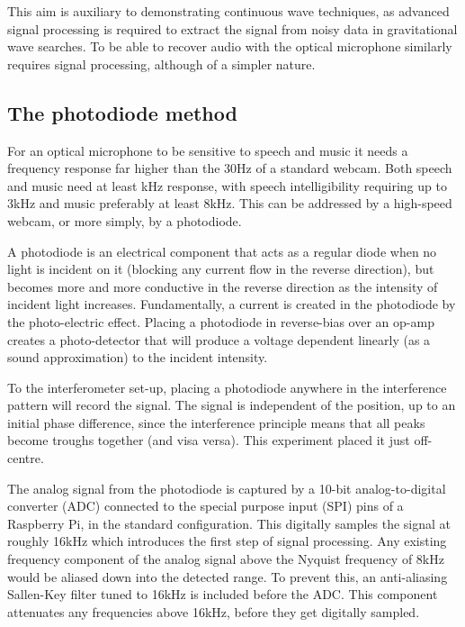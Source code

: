 \documentclass[prb,preprint]{revtex4-1}
\begin{document}
This aim is auxiliary to demonstrating continuous wave techniques, as advanced signal processing is required to extract the signal from noisy data in gravitational wave searches. To be able to recover audio with the optical microphone similarly requires signal processing, although of a simpler nature.

\subsection{The photodiode method}
\label{sec:photodiode}

For an optical microphone to be sensitive to speech and music it needs a frequency response far higher than the 30Hz of a standard webcam. Both speech and music need at least kHz response, with speech intelligibility requiring up to 3kHz and music preferably at least 8kHz. This can be addressed by a high-speed webcam, or more simply, by a photodiode.


A photodiode is an electrical component that acts as a regular diode when no light is incident on it (blocking any current flow in the reverse direction), but becomes more and more conductive in the reverse direction as the intensity of incident light increases. Fundamentally, a current is created in the photodiode by the photo-electric effect. Placing a photodiode in reverse-bias over an op-amp creates a photo-detector that will produce a voltage dependent linearly (as a sound approximation) to the incident intensity.


To the interferometer set-up, placing a photodiode anywhere in the interference pattern will record the signal. The signal is independent of the position, up to an initial phase difference, since the interference principle means that all peaks become troughs together (and visa versa). This experiment placed it just off-centre.


The analog signal from the photodiode is captured by a 10-bit analog-to-digital converter (ADC) connected to the special purpose input (SPI) pins of a Raspberry Pi, in the standard configuration. This digitally samples the signal at roughly 16kHz which introduces the first step of signal processing. Any existing frequency component of the analog signal above the Nyquist frequency of 8kHz would be aliased down into the detected range. To prevent this, an anti-aliasing Sallen-Key filter tuned to 16kHz is included before the ADC. This component attenuates any frequencies above 16kHz, before they get digitally sampled.
\end{document}
